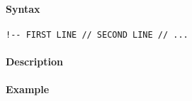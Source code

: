 


	\paragraph{Syntax}\label{syntax}

\begin{verbatim}
!-- FIRST LINE // SECOND LINE // ...
\end{verbatim}

\paragraph{Description}\label{description}

\paragraph{Example}\label{example}


